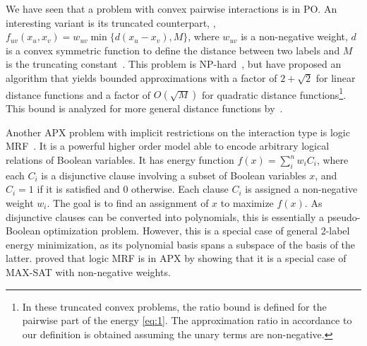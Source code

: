 We have seen that a problem with convex pairwise interactions is in PO. An interesting variant is its truncated counterpart, \ie, $f_{uv}(x_u,x_v) = w_{uv}\min\{d(x_u - x_v), M\}$, where $w_{uv}$ is a non-negative weight, $d$ is a convex symmetric function to define the distance between two labels and $M$ is the truncating constant~\cite{veksler2007graph}.
This problem is NP-hard~\cite{veksler2007graph}, but \citet{Kumar-11-improved} have proposed an algorithm that yields bounded approximations with a factor of $2+\sqrt{2}$ for linear distance functions and a factor of $O(\sqrt{M})$ for quadratic distance functions\footnote{In these truncated convex problems, the ratio bound is defined for the pairwise part of the energy \cref{eq:1}. The approximation ratio in accordance to our definition is obtained assuming the unary terms are non-negative.}. This bound is analyzed for more general distance functions by~\citet{kumar2014rounding}.

Another APX problem with implicit restrictions on the interaction type is logic MRF~\cite{bach2015unifying}. It is a powerful higher order model able to encode arbitrary logical relations of Boolean variables. It has energy function $f(x) = \sum_i^n w_iC_i$, where each $C_i$ is a disjunctive clause involving a subset of Boolean variables $x$, and $C_i = 1$ if it is satisfied and 0 otherwise. Each clause $C_i$ is assigned a non-negative weight $w_i$. The goal is to find an assignment of $x$ to maximize $f(x)$. As disjunctive clauses can be converted into polynomials, this is essentially a pseudo-Boolean optimization problem. However, this is a special case of general 2-label energy minimization, as its polynomial basis spans a subspace of the basis of the latter. \citet{bach2015unifying} proved that logic MRF is in APX by showing that it is a special case of MAX-SAT with non-negative weights.
%

